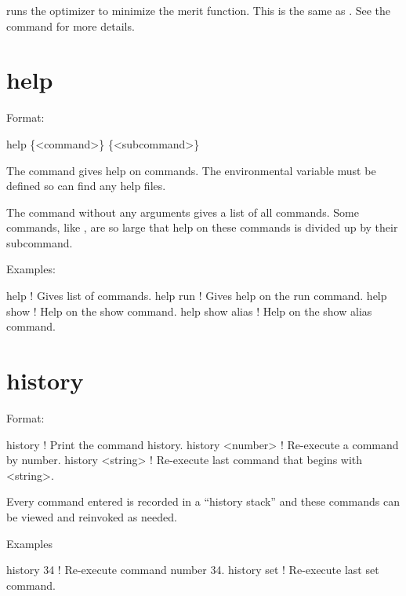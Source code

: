 {{{\vskip 0.2in
 runs the optimizer to minimize the merit function. This is the 
same as . See the  command for more details.

\section{help}
\label{s:help}

Format:
\begin{example}
  help \{<command>\} \{<subcommand>\}
\end{example}

\vskip 0.2in 
The  command gives help on \tao commands. The environmental
variable  must be defined so \tao can find any help files.

The  command without any arguments gives a list of all commands.
Some commands, like , are so large that help on these commands
is divided up by their subcommand.

Examples:
\begin{example}
  help            ! Gives list of commands.
  help run        ! Gives help on the run command.
  help show       ! Help on the show command.
  help show alias ! Help on the show alias command.
\end{example}

\section{history}
\label{s:history}

Format:
\begin{example}
  history           ! Print the command history.
  history <number>  ! Re-execute a command by number.
  history <string>  ! Re-execute last command that begins with <string>.
\end{example}

\vskip 0.2in
Every \tao command entered is recorded in a ``history stack'' and
these commands can be viewed and reinvoked as needed. 

Examples
\begin{example}
  history 34   ! Re-execute command number 34.
  history set  ! Re-execute last set command.  
\end{example}

}}}
